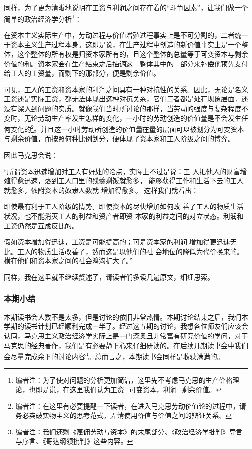 \documentclass[a4paper,twoside,12pt,AutoFakeBold]{ctexart}
\begin{document}
同样，为了更为清晰地说明在工资与利润之间存在着的“斗争因素”，让我们做一个简单的政治经济学分析\footnote{编者注：为了使对问题的分析更加简洁，这里先不考虑马克思的生产价格理论，也即是说，在这里我们认为工资=可变资本，利润=剩余价值。}：\begin{fangsong}
    在资本主义实际生产中，劳动过程与价值增殖过程事实上是不可分割的，二者统一于资本主义生产过程本身。这即是说，在生产过程中创造的新价值事实上是一个整体，这个整体的所有权是归资本家所有的，且这个整体的总量等于可变资本与剩余价值的和。资本家会在生产结束之后抽调这一整体其中的一部分来补偿他预先支付给工人的工资量，而剩下的那部分，便是剩余价值。
\end{fangsong}

可见，工人的工资和资本家的利润之间具有一种对抗性的关系。因此，无论是名义工资还是实际工资，都无法体现出这种对抗关系，它们二者都是处在现象层面，还没有深入到问题的实质。就像我们当时所讨论的那样，当劳动的强度与复杂程度不变时，无论劳动生产率发生怎样的变化，一小时的劳动创造的价值量是不会发生任何变化的\footnote{编者注：在这里有必要提醒一下读者，在进入马克思劳动价值论的过程中，请务必突破实物主义的思考范式，弄清使用价值与价值之间的辩证关系。}。并且这一小时劳动所创造的价值量在量的层面可以被划分为可变资本与剩余价值，而按照何种比例划分，便体现了资本家和工人阶级之间的博弈。

因此马克思会说：
\begin{adjustwidth}{2em}{2em}
    \qquad\fangsong
    “所谓资本迅速增加对工人有好处的论点，实际上不过是说：工
人把他人的财富增殖得愈迅速，落到工人口里的残羹剩饭就愈多，
能够获得工作和生活下去的工人就愈多，依附资本的奴隶人数就
增加得愈多。
这样我们就看出：

即使最有利于工人阶级的情势，即使资本的尽快增加如何改
善了工人的物质生活状况，也不能消灭工人的利益和资产者即资
本家的利益之间的对立状态。利润和工资仍然是互成反比的。

假如资本增加得迅速，工资是可能提高的；可是资本家的利润
增加得更迅速无比。工人的物质生活改善了，然而这是以他们的社
会地位的降低为代价换来的。横在他们和资本家之间的社会鸿沟扩大了。”
\end{adjustwidth}
同样，我在这里就不继续赘述了，请读者们多读几遍原文，细细思索。
\subsubsection{本期小结}
本期读书会人数不是太多，但是讨论的依旧非常热情。本期讨论结束之后，我们本学期的读书计划已经顺利完成一半了。经过这五期的讨论，我想各位师友们应该会认同，马克思主义政治经济学实际上是一门深奥且非常富有研究价值的学问，对于马克思的经典著作，我们是有必要静下心来仔细研读的。在后续几期读书会中我们会尽量完成余下的讨论内容\footnote{编者注：我们还剩《雇佣劳动与资本》的末尾部分、《政治经济学批判》导言与序言、《哥达纲领批判》这些内容。}。总而言之，本期读书会同样是收获满满的。
\end{document}

